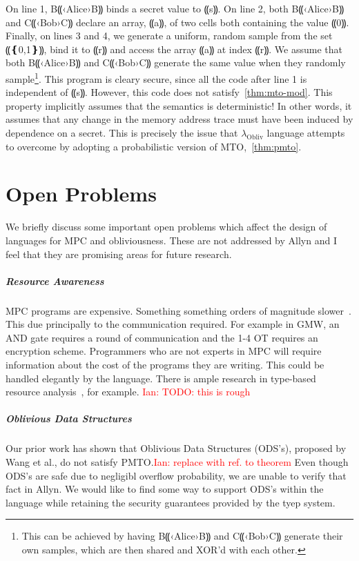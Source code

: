 \documentclass{report}
\newcommand{\lang}{Allyn\xspace}
\newcommand{\obliv}{\ensuremath{\lambda_{\mathrm{Obliv}}}\xspace}
\newcommand{\ins}[1]{\textcolor{red}{Ian: #1}}
\newcommand{\alice}{B⸨‹Alice›B⸩\xspace}
\newcommand{\bob}{C⸨‹Bob›C⸩\xspace}
\begin{document}
On line 1, \alice binds a secret value to ⸨s⸩. On line 2, both \alice and \bob declare an array, ⸨a⸩, of two cells both containing the value
⸨0⸩. Finally, on lines 3 and 4, we generate a uniform, random sample from the set ⸨❴0,1❵⸩, bind it to ⸨r⸩ and access the array ⸨a⸩ at index
⸨r⸩. We assume that both \alice and \bob generate the same value when they randomly sample\footnote{This can be achieved by having \alice and \bob generate their own samples, which are then shared and XOR'd with each other.}. This program is cleary secure, since all the code after
line 1 is independent of ⸨s⸩. However, this code does not satisfy~\ref{thm:mto-mod}. This property implicitly assumes that the semantics is
deterministic! In other words, it assumes that any change in the memory address trace must have been induced by dependence on a secret. This
is precisely the issue that \obliv language attempts to overcome by adopting a probabilistic version of MTO,~\ref{thm:pmto}.

\begin{theorem}[PMTO\%]\label{thm:pmto-mod}
\end{theorem}

\chapter{Open Problems}

We briefly discuss some important open problems which affect the design of languages for
MPC and obliviousness. These are not addressed by \lang and I feel that they are promising
areas for future research.

\paragraph{Resource Awareness}
MPC programs are expensive. Something something orders of magnitude slower~\cite{}. This due principally to the communication
required. For example in GMW, an AND gate requires a round of communication and the 1-4 OT requires an encryption scheme.
Programmers who are not experts in MPC will require information about the cost of the programs they are writing. This could be
handled elegantly by the language. There is ample research in type-based resource analysis~\cite{}, for example. \ins{TODO: this is rough}

\paragraph{Oblivious Data Structures}
Our prior work has shown that Oblivious Data Structures (ODS's), proposed by Wang et al., do not satisfy PMTO.\ins{replace with ref. to theorem} Even though ODS's are safe due to negligibl overflow probability, we are unable to verify that fact in \lang. We would like to find some
way to support ODS's within the language while retaining the security guarantees provided by the tyep system.
\end{document}
